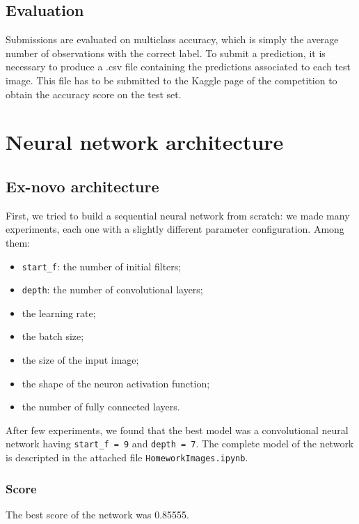 \documentclass[12pt,a4paper]{report}
\begin{document}
	\section{Evaluation}
Submissions are evaluated on multiclass accuracy, which is simply the average number of observations with the correct label.
To submit a prediction, it is necessary to produce a .csv file containing the predictions associated to each test image. This file has to be submitted to the Kaggle page of the competition to obtain the accuracy score on the test set.


	\chapter{Neural network architecture}
		\section{Ex-novo architecture}
	First, we tried to build a sequential neural network from scratch: we made many experiments, each one with a slightly different parameter configuration. Among them:
			\begin{itemize}
				\item \texttt{start\_f}: the number of initial filters;
				\item \texttt{depth}: the number of convolutional layers;
				\item the learning rate;
				\item the batch size;
				\item the size of the input image;
				\item the shape of the neuron activation function;	
				\item the number of fully connected layers.
			\end{itemize}
	After few experiments, we found that the best model was a convolutional neural network having \texttt{start\_f = 9} and \texttt{depth = 7}. The complete model of the network is descripted in the attached file \texttt{HomeworkImages.ipynb}.
		\subsection{Score}
	The best score of the network was 0.85555.
\end{document}
